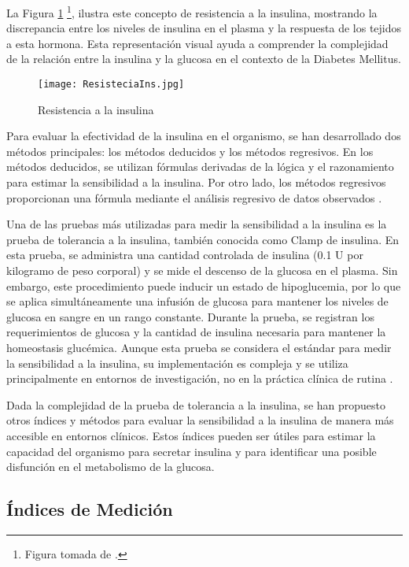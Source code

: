 La Figura \ref{fig:Resistencia} \footnote{Figura tomada de \cite{ImgResis}.}, ilustra este concepto de resistencia a la insulina, mostrando la discrepancia entre los niveles de insulina en el plasma y la respuesta de los tejidos a esta hormona. Esta representación visual ayuda a comprender la complejidad de la relación entre la insulina y la glucosa en el contexto de la Diabetes Mellitus.

\begin{figure}[H]
    \centering
    \texttt{[image: ResisteciaIns.jpg]}
    \caption{Resistencia a la insulina}
    \label{fig:Resistencia}
\end{figure}

Para evaluar la efectividad de la insulina en el organismo, se han desarrollado dos métodos principales: los métodos deducidos y los métodos regresivos. En los métodos deducidos, se utilizan fórmulas derivadas de la lógica y el razonamiento para estimar la sensibilidad a la insulina. Por otro lado, los métodos regresivos proporcionan una fórmula mediante el análisis regresivo de datos observados \cite{MedicionEstimacion}.

Una de las pruebas más utilizadas para medir la sensibilidad a la insulina es la prueba de tolerancia a la insulina, también conocida como Clamp de insulina. En esta prueba, se administra una cantidad controlada de insulina (0.1 U por kilogramo de peso corporal) y se mide el descenso de la glucosa en el plasma. Sin embargo, este procedimiento puede inducir un estado de hipoglucemia, por lo que se aplica simultáneamente una infusión de glucosa para mantener los niveles de glucosa en sangre en un rango constante. Durante la prueba, se registran los requerimientos de glucosa y la cantidad de insulina necesaria para mantener la homeostasis glucémica. Aunque esta prueba se considera el estándar para medir la sensibilidad a la insulina, su implementación es compleja y se utiliza principalmente en entornos de investigación, no en la práctica clínica de rutina \cite{MedicionEstimacion}.

Dada la complejidad de la prueba de tolerancia a la insulina, se han propuesto otros índices y métodos para evaluar la sensibilidad a la insulina de manera más accesible en entornos clínicos. Estos índices pueden ser útiles para estimar la capacidad del organismo para secretar insulina y para identificar una posible disfunción en el metabolismo de la glucosa.

\subsection{Índices de Medición}

